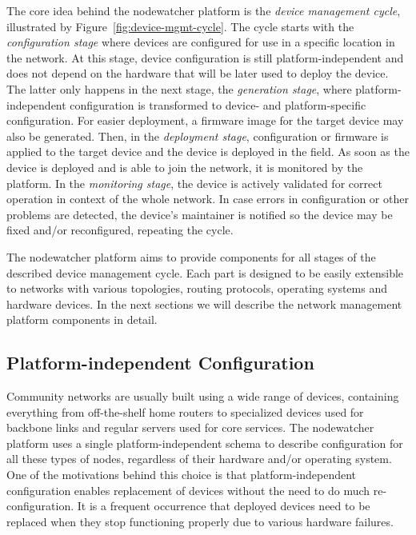 \documentclass[5p,sort&compress]{elsarticle}
\begin{document}
The core idea behind the nodewatcher platform is the \textit{device management cycle}, illustrated by Figure~\ref{fig:device-mgmt-cycle}.
The cycle starts with the \textit{configuration stage} where devices are configured for use in a specific location in the network.
At this stage, device configuration is still platform-independent and does not depend on the hardware that will be later used to deploy the device.
The latter only happens in the next stage, the \textit{generation stage}, where platform-independent configuration is transformed to device- and platform-specific configuration.
For easier deployment, a firmware image for the target device may also be generated.
Then, in the \textit{deployment stage}, configuration or firmware is applied to the target device and the device is deployed in the field.
As soon as the device is deployed and is able to join the network, it is monitored by the platform.
In the \textit{monitoring stage}, the device is actively validated for correct operation in context of the whole network.
In case errors in configuration or other problems are detected, the device's maintainer is notified so the device may be fixed and/or reconfigured, repeating the cycle.

The nodewatcher platform aims to provide components for all stages of the described device management cycle.
Each part is designed to be easily extensible to networks with various topologies, routing protocols, operating systems and hardware devices.
In the next sections we will describe the network management platform components in detail.

\subsection{Platform-independent Configuration}

Community networks are usually built using a wide range of devices, containing everything from off-the-shelf home routers to specialized devices used for backbone links and regular servers used for core services.
The nodewatcher platform uses a single platform-independent schema to describe configuration for all these types of nodes, regardless of their hardware and/or operating system.
One of the motivations behind this choice is that platform-independent configuration enables replacement of devices without the need to do much re-configuration.
It is a frequent occurrence that deployed devices need to be replaced when they stop functioning properly due to various hardware failures.
\end{document}
